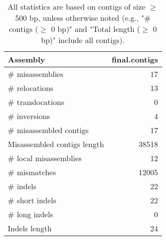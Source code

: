 \documentclass[12pt,a4paper]{article}
\begin{document}
\begin{table}[ht]
\begin{center}
\caption{All statistics are based on contigs of size $\geq$ 500 bp, unless otherwise noted (e.g., "\# contigs ($\geq$ 0 bp)" and "Total length ($\geq$ 0 bp)" include all contigs).}
\begin{tabular}{|l*{1}{|r}|}
\hline
Assembly & final.contigs \\ \hline
\# misassemblies & 17 \\ \hline
\hspace{5mm}\# relocations & 13 \\ \hline
\hspace{5mm}\# translocations & 0 \\ \hline
\hspace{5mm}\# inversions & 4 \\ \hline
\# misassembled contigs & 17 \\ \hline
Misassembled contigs length & 38518 \\ \hline
\# local misassemblies & 12 \\ \hline
\# mismatches & 12005 \\ \hline
\# indels & 22 \\ \hline
\hspace{5mm}\# short indels & 22 \\ \hline
\hspace{5mm}\# long indels & 0 \\ \hline
Indels length & 24 \\ \hline
\end{tabular}
\end{center}
\end{table}
\end{document}
